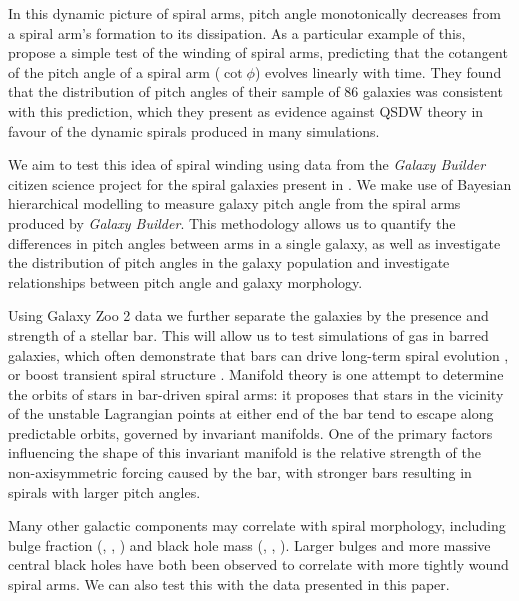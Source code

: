 In this dynamic picture of spiral arms, pitch angle monotonically decreases from a spiral arm's formation to its dissipation. As a particular example of this, \citet{2019arXiv190910291P} propose a simple test of the winding of spiral arms, predicting that the cotangent of the pitch angle of a spiral arm ($\cot \phi$) evolves linearly with time. They found that the distribution of pitch angles of their sample of 86 galaxies was consistent with this prediction, which they present as evidence against QSDW theory in favour of the dynamic spirals produced in many simulations.

We aim to test this idea of spiral winding using data from the \textit{Galaxy Builder} citizen science project for the spiral galaxies present in \citet{2020arXiv200610450L}. We make use of Bayesian hierarchical modelling to measure galaxy pitch angle from the spiral arms produced by \textit{Galaxy Builder}. This methodology allows us to quantify the differences in pitch angles between arms in a single galaxy, as well as investigate the distribution of pitch angles in the galaxy population and investigate relationships between pitch angle and galaxy morphology.

Using Galaxy Zoo 2 data \citep{Willett2013:1308.3496v2} we further separate the galaxies by the presence and strength of a stellar bar. This will allow us to test simulations of gas in barred galaxies, which often demonstrate that bars can drive long-term spiral evolution \citep{2008A&A...489..115R}, or boost transient spiral structure \citep{2012MNRAS.426..167G}. Manifold theory \citep{2006A&A...453...39R,2009MNRAS.394...67A,2009MNRAS.400.1706A} is one attempt to determine the orbits of stars in bar-driven spiral arms: it proposes that stars in the vicinity of the unstable Lagrangian points at either end of the bar tend to escape along predictable orbits, governed by invariant manifolds. One of the primary factors influencing the shape of this invariant manifold is the relative strength of the non-axisymmetric forcing caused by the bar, with stronger bars resulting in spirals with larger pitch angles.

Many other galactic components may correlate with spiral morphology, including bulge fraction (\citealt{1975A&A....44..363Y}, \citealt{2013MNRAS.436.1074S}, \citealt{2019MNRAS.487.1808M}) and black hole mass (\citealt{2008ApJ...678L..93S}, \citealt{2017MNRAS.471.2187D}, \citealt{2019MS&E..571a2118A}). Larger bulges and more massive central black holes have both been observed to correlate with more tightly wound spiral arms. We can also test this with the data presented in this paper.

